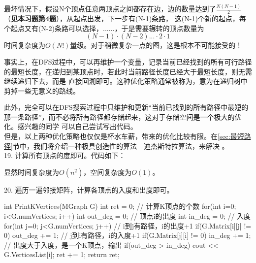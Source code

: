 最坏情况下，假设N个顶点任意两顶点之间都存在边，边的数量达到了$ \frac{N(N-1)}{2} $（{\color{red}\textbf{见本习题第4题}}），从起点出发，下一步有(N-1)条路，
这(N-1)个新的起点，每个起点又有(N-2)条路可以选择，......，于是需要辗转的顶点数量为
\[
    (N-1)\cdot (N-2)... \cdot 2 \cdot 1
\]
时间复杂度为$O(N!)$量级。对于稍微复杂一点的图，这是根本不可能接受的！

事实上，在DFS过程中，可以再维护一个变量，记录当前已经找到的所有可行路径的最短长度，在递归到某顶点时，若此时当前路径长度已经大于最短长度，则无需继续递归下去，而是
直接回溯即可。这种优化策略通常被称为，意为在递归树中剪掉一些无意义的路线。

此外，完全可以在DFS搜索过程中只维护和更新“当前已找到的所有路径中最短的那一条路径”，而不必将所有路径都存储起来，这对于存储空间是一个极大的优化。感兴趣的同学
可以自己尝试写出代码。\\

但是，以上两种优化策略也仅仅是杯水车薪，带来的优化比较有限。在\ref{sec:最短路径}节中，我们将介绍一种极具创造性的算法---迪杰斯特拉算法，来解决
。\\

19. 计算所有顶点的度即可。代码如下：
显然时间复杂度为$O(n^2)$，空间复杂度为$O(1)$。

\vspace{\baselineskip}

20. 遍历一遍邻接矩阵，计算各顶点的入度和出度即可。
\begin{cppcode}
    int PrintKVertices(MGraph G) {
        int ret = 0;    // 计算K顶点的个数
        for(int i=0; i<G.numVertices; i++) {
            int out_deg = 0;    // 顶点i的出度
            int in_deg = 0;     // 入度
            for(int j=0; j<G.numVertices; j++) {
                // i到j有路径，i的出度+1
                if(G.Matrix[i][j] != 0) out_deg += 1;
                // j到i有路径，i的入度+1
                if(G.Matrix[j][i] != 0) in_deg += 1;
            }
            // 出度大于入度，是一个K顶点，输出
            if(out_deg > in_deg) {
                cout << G.VerticesList[i];
                ret += 1;
            }
        }
        return ret;
    }
\end{cppcode}

